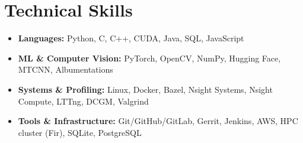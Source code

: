 \documentclass{article}
\begin{document}
\section*{Technical Skills}
\begin{itemize}
    \item \textbf{Languages:} Python, C, C++, CUDA, Java, SQL, JavaScript
    \vspace{-8px}
    \item \textbf{ML \& Computer Vision:} PyTorch, OpenCV, NumPy, Hugging Face, MTCNN, Albumentations
    \vspace{-8px}
    \item \textbf{Systems \& Profiling:} Linux, Docker, Bazel, Nsight Systems, Nsight Compute, LTTng, DCGM, Valgrind
    \vspace{-8px}
    \item \textbf{Tools \& Infrastructure:} Git/GitHub/GitLab, Gerrit, Jenkins, AWS, HPC cluster (Fir), SQLite, PostgreSQL
\end{itemize}
\end{document}
